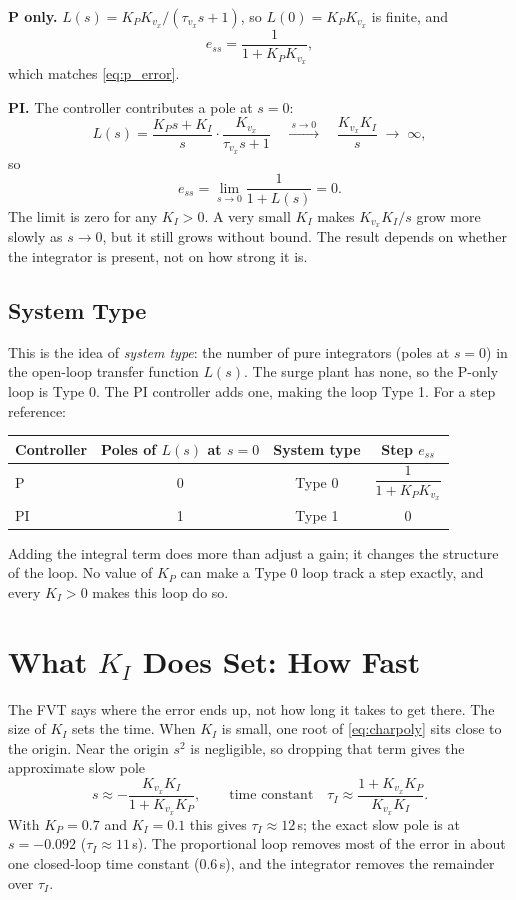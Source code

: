 \documentclass[12pt]{article}
\begin{document}
\textbf{P only.}  $L(s) = K_P K_{v_x}/(\tau_{v_x}s + 1)$, so $L(0) = K_P K_{v_x}$ is finite, and
\[
  e_{ss} = \frac{1}{1 + K_P K_{v_x}},
\]
which matches \cref{eq:p_error}.

\textbf{PI.}  The controller contributes a pole at $s = 0$:
\[
  L(s) = \frac{K_P s + K_I}{s}\cdot\frac{K_{v_x}}{\tau_{v_x} s + 1}
  \quad\xrightarrow{\;s\to 0\;}\quad \frac{K_{v_x} K_I}{s} \;\to\; \infty,
\]
so
\[
  e_{ss} = \lim_{s\to 0}\frac{1}{1 + L(s)} = 0.
\]
The limit is zero for any $K_I > 0$.  A very small $K_I$ makes $K_{v_x}K_I/s$ grow more slowly as $s \to 0$, but it still grows without bound.  The result depends on whether the integrator is present, not on how strong it is.

\subsection{System Type}

This is the idea of \emph{system type}: the number of pure integrators (poles at $s=0$) in the open-loop transfer function $L(s)$.  The surge plant has none, so the P-only loop is Type 0.  The PI controller adds one, making the loop Type 1.  For a step reference:

\begin{center}
\begin{tabular}{lccc}
  \toprule
  Controller & Poles of $L(s)$ at $s=0$ & System type & Step $e_{ss}$ \\
  \midrule
  P  & 0 & Type 0 & $\dfrac{1}{1 + K_P K_{v_x}}$ \\[1.2ex]
  PI & 1 & Type 1 & $0$ \\
  \bottomrule
\end{tabular}
\end{center}

Adding the integral term does more than adjust a gain; it changes the structure of the loop.  No value of $K_P$ can make a Type 0 loop track a step exactly, and every $K_I > 0$ makes this loop do so.



\section{What $K_I$ Does Set: How Fast}
\label{sec:ki_speed}

The FVT says where the error ends up, not how long it takes to get there.  The size of $K_I$ sets the time.  When $K_I$ is small, one root of \cref{eq:charpoly} sits close to the origin.  Near the origin $s^2$ is negligible, so dropping that term gives the approximate slow pole
\[
  s \approx -\frac{K_{v_x}K_I}{1 + K_{v_x}K_P},
  \qquad\text{time constant}\quad
  \tau_I \approx \frac{1 + K_{v_x}K_P}{K_{v_x}K_I}.
\]
With $K_P = 0.7$ and $K_I = 0.1$ this gives $\tau_I \approx 12$\,s; the exact slow pole is at $s = -0.092$ ($\tau_I \approx 11$\,s).  The proportional loop removes most of the error in about one closed-loop time constant (0.6\,s), and the integrator removes the remainder over $\tau_I$.
\end{document}
